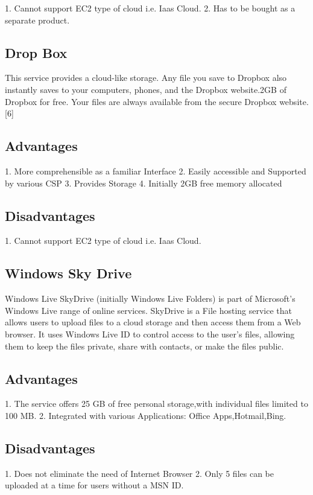 1.  Cannot support EC2 type of cloud i.e. Iaas Cloud.
2.   Has to be bought as a separate product.


\subsection{Drop Box}

This service provides a cloud-like storage. Any file you save to Dropbox also instantly saves to your computers, phones, and the Dropbox website.2GB of Dropbox for free. Your files are always available from the secure Dropbox website.[6]

\subsection{Advantages}

1.  More comprehensible as a familiar Interface
2.	Easily accessible and Supported by various CSP
3.	Provides Storage
4.	Initially 2GB free memory allocated


\subsection{Disadvantages}

1. Cannot support EC2 type of cloud i.e. Iaas Cloud.

\subsection{Windows Sky Drive}

Windows Live SkyDrive (initially Windows Live Folders) is part of Microsoft's Windows Live range of online services. SkyDrive is a File hosting service that allows users to upload files to a cloud storage and then access them from a Web browser. It uses Windows Live ID to control access to the user's files, allowing them to keep the files private, share with contacts, or make the files public.

\subsection{Advantages}

1.  The service offers 25 GB of free personal storage,with individual files limited to 100 MB.
2.	Integrated with various Applications: Office Apps,Hotmail,Bing.
 
\subsection{Disadvantages}


1.  Does not eliminate the need of Internet Browser
2.	Only 5 files can be uploaded at a time for users without a MSN ID.







